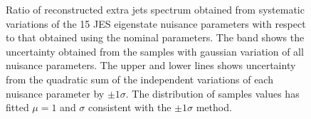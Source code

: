 \begin{figure}
\caption{Ratio of reconstructed extra jets spectrum obtained from systematic variations of the 15 JES eigenstate nuisance parameters with respect to that obtained using the nominal parameters. The band shows the uncertainty obtained from the samples with gaussian variation of all nuisance parameters. The upper and lower lines shows uncertainty from the quadratic sum of the independent variations of each nuisance parameter by $\pm 1 \sigma$. The distribution of samples values has fitted $\mu=1$ and $\sigma$ consistent with the $\pm 1 \sigma$ method. }
\label{fig:ToyJES1}
\end{figure}





